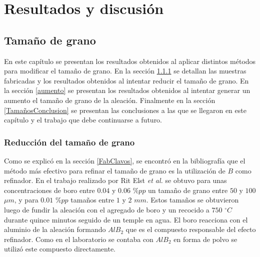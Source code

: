 \documentclass[a4paper,12pt,fleqn,twoside,openany]{book}
\begin{document}
\chapter{Resultados y discusión}



\section{Tamaño de grano}

En este capítulo se presentan los resultados obtenidos al aplicar distintos métodos para modificar el tamaño de grano. En la sección \ref{reduccion} se detallan las muestras fabricadas y los resultados obtenidos al intentar reducir el tamaño de grano. En la sección \ref{aumento} se presentan los resultados obtenidos al intentar generar un aumento el tamaño de grano de la aleación. Finalmente en la sección \ref{TamañosConclusion} se presentan las conclusiones a las que se llegaron en este capítulo y el trabajo que debe continuarse a futuro. 


\subsection{Reducción del tamaño de grano} \label{reduccion}

Como se explicó en la sección \ref{FabClavos}, se encontró en la bibliografía que el método más efectivo para refinar el tamaño de grano es la utilización de $B$ como refinador. En el trabajo realizado por Rit Elst \textit{et al.} \cite{ritelst} se obtuvo para unas concentraciones de boro entre $0.04$ y $0.06$ $\% pp$ un tamaño de grano entre $50$ y $100$ $\mu m$, y para $0.01$ $\%pp$ tamaños entre $1$ y $2$ $mm$. Estos tamaños se obtuvieron luego de fundir la aleación con el agregado de boro y un recocido a $750$ $^\circ C$ durante quince minutos seguido de un temple en agua. El boro reacciona con el aluminio de la aleación formando $AlB_2$ que es el compuesto responsable del efecto refinador. Como en el laboratorio se contaba con $AlB_2$ en forma de polvo se utilizó este compuesto directamente. 
\end{document}

